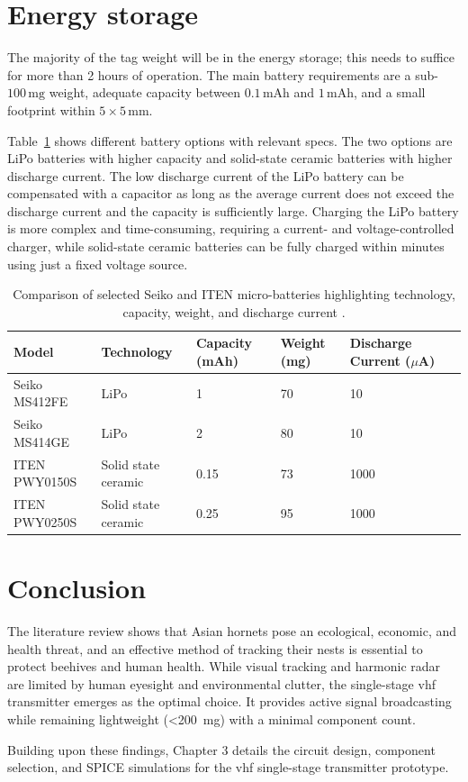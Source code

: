 \section{Energy storage}

The majority of the tag weight will be in the energy storage; this needs to suffice for more than 2 hours of operation. The main battery requirements are a sub-$100\,\text{mg}$ weight, adequate capacity between $0.1\,\text{mAh}$ and $1\,\text{mAh}$, and a small footprint within $5 \times 5\,\text{mm}$. 

Table~\ref{tab:battery_comparison} shows different battery options with relevant specs. The two options are LiPo batteries with higher capacity and solid-state ceramic batteries with higher discharge current. The low discharge current of the LiPo battery can be compensated with a capacitor as long as the average current does not exceed the discharge current and the capacity is sufficiently large. Charging the LiPo battery is more complex and time-consuming, requiring a current- and voltage-controlled charger, while solid-state ceramic batteries can be fully charged within minutes using just a fixed voltage source.

\begin{table}[htbp]
	\centering
	\caption{Comparison of selected Seiko and ITEN micro-batteries highlighting technology, capacity, weight, and discharge current \cite{MicroBatteryMS} \cite{ExploreITENsRange}.}
	\label{tab:battery_comparison}
	\begin{tabular}{llllll}
		\toprule
		\small
		\textbf{Model} & \textbf{Technology} & \textbf{Capacity (mAh)} & \textbf{Weight (mg)} & \textbf{Discharge Current ($\mu$A)} \\
		\midrule
		Seiko MS412FE & LiPo & 1 & 70 & 10 \\
		Seiko MS414GE & LiPo & 2 & 80 & 10 \\
		ITEN PWY0150S & Solid state ceramic & 0.15 & 73 & 1000 \\
		ITEN PWY0250S & Solid state ceramic & 0.25 & 95 & 1000 \\
		\bottomrule
	\end{tabular}
\end{table}


\section{Conclusion}

The literature review shows that Asian hornets pose an ecological, economic, and health threat, and an effective method of tracking their nests is essential to protect beehives and human health. While visual tracking and harmonic radar are limited by human eyesight and environmental clutter, the single-stage \gls{vhf} transmitter emerges as the optimal choice. It provides active signal broadcasting while remaining lightweight (<200~mg) with a minimal component count.

Building upon these findings, Chapter 3 details the circuit design, component selection, and SPICE simulations for the \gls{vhf} single-stage transmitter prototype.